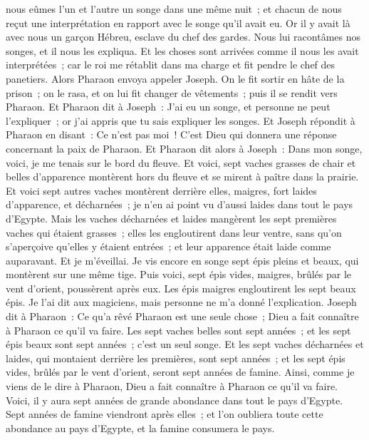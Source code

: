 \begin{multicols}{2}
nous eûmes l'un et l'autre un songe dans une même nuit~; et chacun de nous reçut une interprétation en rapport avec le songe qu'il avait eu.
Or il y avait là avec nous un garçon Hébreu, esclave du chef des gardes. Nous lui racontâmes nos songes, et il nous les expliqua.
Et les choses sont arrivées comme il nous les avait interprétées~; car le roi me rétablit dans ma charge et fit pendre le chef des panetiers.
Alors Pharaon envoya appeler Joseph. On le fit sortir en hâte de la prison~; on le rasa, et on lui fit changer de vêtements~; puis il se rendit vers Pharaon.
Et Pharaon dit à Joseph~: J'ai eu un songe, et personne ne peut l'expliquer~; or j'ai appris que tu sais expliquer les songes.
Et Joseph répondit à Pharaon en disant~: Ce n'est pas moi~! C'est Dieu qui donnera une réponse concernant la paix de Pharaon.
Et Pharaon dit alors à Joseph~: Dans mon songe, voici, je me tenais sur le bord du fleuve.
Et voici, sept vaches grasses de chair et belles d'apparence montèrent hors du fleuve et se mirent à paître dans la prairie.
Et voici sept autres vaches montèrent derrière elles, maigres, fort laides d'apparence, et décharnées~; je n'en ai point vu d'aussi laides dans tout le pays d'Egypte.
Mais les vaches décharnées et laides mangèrent les sept premières vaches qui étaient grasses~;
elles les engloutirent dans leur ventre, sans qu'on s'aperçoive qu'elles y étaient entrées~; et leur apparence était laide comme auparavant. Et je m'éveillai.
Je vis encore en songe sept épis pleins et beaux, qui montèrent sur une même tige.
Puis voici, sept épis vides, maigres, brûlés par le vent d'orient, poussèrent après eux.
Les épis maigres engloutirent les sept beaux épis. Je l'ai dit aux magiciens, mais personne ne m'a donné l'explication. 
Joseph dit à Pharaon~: Ce qu'a rêvé Pharaon est une seule chose~; Dieu a fait connaître à Pharaon ce qu'il va faire.
Les sept vaches belles sont sept années~; et les sept épis beaux sont sept années~; c'est un seul songe.
Et les sept vaches décharnées et laides, qui montaient derrière les premières, sont sept années~; et les sept épis vides, brûlés par le vent d'orient, seront sept années de famine.
Ainsi, comme je viens de le dire à Pharaon, Dieu a fait connaître à Pharaon ce qu'il va faire.
Voici, il y aura sept années de grande abondance dans tout le pays d'Egypte.
Sept années de famine viendront après elles~; et l'on oubliera toute cette abondance au pays d'Egypte, et la famine consumera le pays.

\end{multicols}
